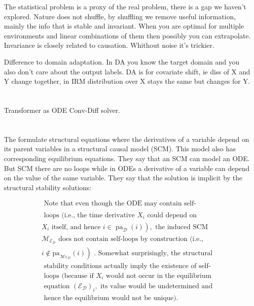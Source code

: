 \documentclass{article}
\newcommand{\citeall}[1]{\citeauthor{#1}}
\begin{document}
The statistical problem is a proxy of the real problem, there is a gap we haven't explored. Nature does not shuffle, by shuffling we remove useful information, mainly the info that is stable and invariant. When you are optimal for multiple environments and linear combinations of them then possibly you can extrapolate. Invariance is closely related to causation. Whithout noise it's trickier.

Difference to domain adaptation. In DA you know the target domain and you also don't care about the output labels. DA is for covariate shift, ie diss of X and Y change together, in IRM distribution over X stays the same but changes for Y.

\section{\citeall{Lu2019UnderstandingView}}
Transformer as ODE Conv-Diff solver.

\section{\citeall{Mooij2013FromCase}}

The formulate structural equations where the derivatives of a variable depend on its parent variables in a structural causal model (SCM). This model also has corresponding equilibrium equations. They say that an SCM can model an ODE. But SCM there are no loops while in ODEs a derivative of a variable can depend on the value of the same variable. They say that the solution is implicit by the structural stability solutions:

$$
\begin{array}{l}\text { Note that even though the ODE may contain self- } \\ \text { loops (i.e., the time derivative } \dot{X}_{i} \text { could depend on } \\ X_{i} \text { itself, and hence } \left.i \in \operatorname{pa}_{\mathcal{D}}(i)\right), \text { the induced SCM } \\ \mathcal{M}_{\mathcal{E}_{\mathcal{D}}} \text { does not contain self-loops by construction (i.e., } \\ \left.i \notin \mathrm{pa}_{\mathcal{M} \varepsilon_{\mathcal{D}}}(i)\right) \text { . Somewhat surprisingly, the structural } \\ \text { stability conditions actually imply the existence of self- } \\ \text { loops (because if } X_{i} \text { would not occur in the equilibrium } \\ \text { equation }\left(\mathcal{E}_{\mathcal{D}}\right)_{i}, \text { its value would be undetermined and } \\ \text { hence the equilibrium would not be unique). }\end{array}
$$
\end{document}

